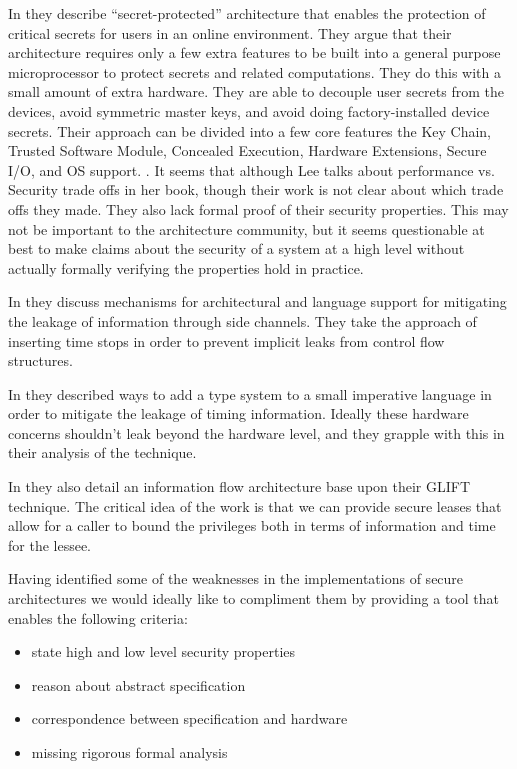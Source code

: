 \documentclass[12pt, titlepage]{article}
\begin{document}
In \cite{lee05} they describe “secret-protected” architecture that enables the protection of critical secrets for users in an online environment. They argue that their architecture requires only a few extra features to be built into a general purpose microprocessor to protect secrets and related computations. They do this with a small amount of extra hardware. They are able to decouple user secrets from the devices, avoid symmetric master keys, and avoid doing factory-installed device secrets. Their approach can be divided into a few core features the Key Chain, Trusted Software Module, Concealed Execution, Hardware Extensions, Secure I/O, and OS support. \cite{PicoCoq2013:POPL}. It seems that although Lee talks about performance vs. Security trade offs in her book, though their work is not clear about which trade offs they made. They also lack formal proof of their security properties. This may not be important to the architecture community, but it seems questionable at best to make claims about the security of a system at a high level without actually formally verifying the properties hold in practice.

In \cite{blackboxed} \cite{languagebased} they discuss mechanisms for architectural and language support for mitigating the
leakage of information through side channels. They take the approach of inserting time stops in order to prevent implicit
leaks from control flow structures. 

In \cite{languagebased} they described ways to add a type system to a small imperative language in order to mitigate the leakage of timing information.
Ideally these hardware concerns shouldn't leak beyond the hardware level, and they grapple with this in their analysis of the technique. 

In \cite{exec-leases} they also detail an information flow architecture base upon their GLIFT technique. The critical idea of the work is that
we can provide secure leases that allow for a caller to bound the privileges both in terms of information and time for the lessee. 

Having identified some of the weaknesses in the implementations of secure architectures we would 
ideally like to compliment them by providing a tool that enables the following criteria:
\begin{itemize}
    \item state high and low level security properties
    \item reason about abstract specification
    \item correspondence between specification and hardware
    \item missing rigorous formal analysis
\end{itemize}
\end{document}
